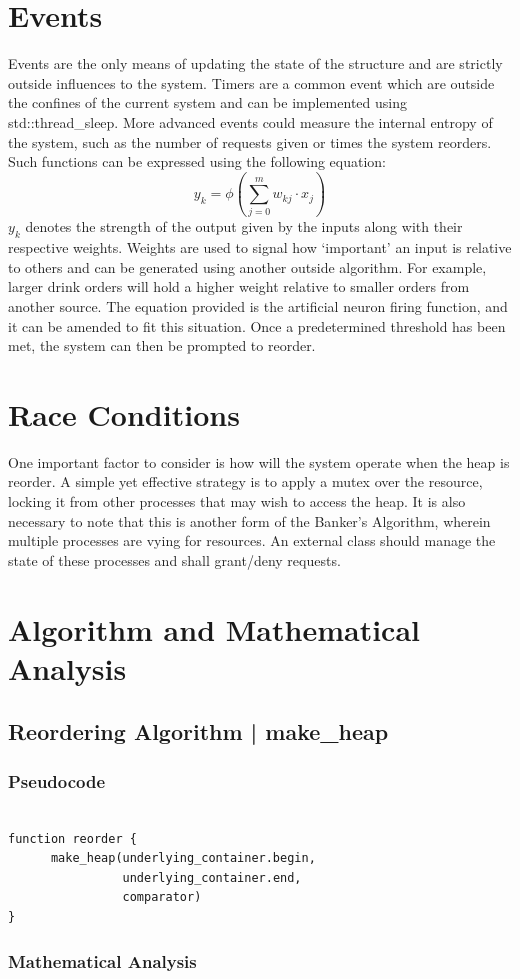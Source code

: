 \documentclass{article}
\begin{document}
\newpage

\section{Events}

Events are the only means of updating the state of the structure and are strictly outside influences to the system.
Timers are a common event which are outside the confines of the current system and can be implemented using std::thread_sleep.
More advanced events could measure the internal entropy of the system, such as the number of requests given or times the system reorders.
Such functions can be expressed using the following equation:
\[ 
		y_{k} = \phi \left( \sum_{j=0}^{m}w_{kj} \cdot x_{j} \right)
\]
$y_{k}$ denotes the strength of the output given by the inputs along with their respective weights.
Weights are used to signal how `important' an input is relative to others and can be generated using another outside algorithm.
For example, larger drink orders will hold a higher weight relative to smaller orders from another source.
The equation provided is the artificial neuron firing function, and it can be amended to fit this situation.
Once a predetermined threshold has been met, the system can then be prompted to reorder.

\section{Race Conditions}

One important factor to consider is how will the system operate when the heap is reorder.
A simple yet effective strategy is to apply a mutex over the resource, locking it from other processes that may wish to access the heap.
It is also necessary to note that this is another form of the Banker's Algorithm, wherein multiple processes are vying for resources.
An external class should manage the state of these processes and shall grant/deny requests.

\newpage

\section{Algorithm and Mathematical Analysis}

\subsection{Reordering Algorithm | make_heap}

\subsubsection{Pseudocode}

\begin{verbatim}

function reorder {
      make_heap(underlying_container.begin, 
                underlying_container.end,
                comparator)
}
\end{verbatim}

\subsubsection{Mathematical Analysis}
\end{document}
